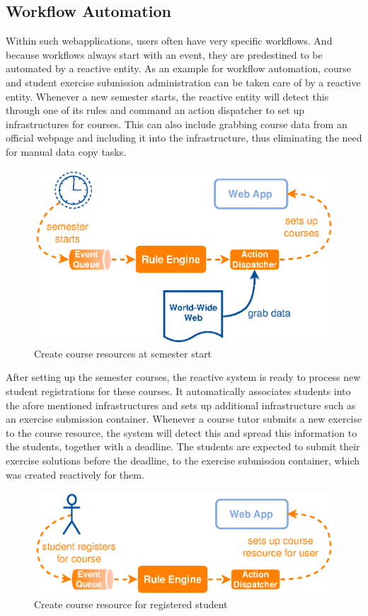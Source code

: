 \subsection{Workflow Automation}
Within such \textrm{\glspl{webapplication}}, users often have very specific workflows.
And because workflows always start with an event, they are predestined to be automated by a reactive entity.
As an example for workflow automation, course and student exercise submission administration can be taken care of by a reactive entity.
Whenever a new semester starts, the reactive entity will detect this through one of its rules and command an action dispatcher to set up infrastructures for courses.
This can also include grabbing course data from an official webpage and including it into the infrastructure, thus eliminating the need for manual data copy tasks.
\begin{figure}[!ht]
  \centering
  \includegraphics{figures/ProBinderCourseSetup}
  \caption{Create course resources at semester start}
  \label{fig:ProBinderCourseSetup}
\end{figure}

After setting up the semester courses, the reactive system is ready to process new student registrations for these courses.
It automatically associates students into the afore mentioned infrastructures and sets up additional infrastructure such as an exercise submission container.
Whenever a course tutor submits a new exercise to the course resource, the system will detect this and spread this information to the students, together with a deadline.
The students are expected to submit their exercise solutions before the deadline, to the exercise submission container, which was created reactively for them.
\begin{figure}[!ht]
  \centering
  \includegraphics{figures/ProBinderStudentRegisters}
  \caption{Create course resource for registered student}
  \label{fig:ProBinderStudentRegisters}
\end{figure}

